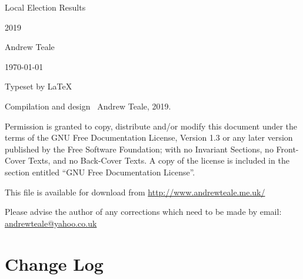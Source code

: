 \documentclass[a4paper,openany]{book}
\begin{document}

\begin{titlepage}

\begin{center}

\Huge Local Election Results

2019

\bigskip

\Large Andrew Teale

\vfill

\newcommand\versionno{0.10.1}


\today

\end{center}

\end{titlepage}


\begin{center}

\bigskip

Typeset by \LaTeX{} 

\bigskip

Compilation and design \textcopyright\ Andrew Teale, 2019.

 Permission is granted to copy, distribute and/or modify this document
 under the terms of the GNU Free Documentation License, Version 1.3
 or any later version published by the Free Software Foundation;
 with no Invariant Sections, no Front-Cover Texts, and no Back-Cover Texts.
 A copy of the license is included in the section entitled ``GNU
 Free Documentation License''.

\bigskip

This file is available for download from
\url{http://www.andrewteale.me.uk/}

\bigskip

Please advise the author of any corrections which need to be made by
email: \url{andrewteale@yahoo.co.uk}

\vfill
\end{center}

\section*{Change Log}


%
\end{document}

